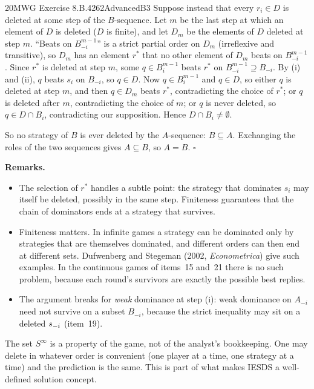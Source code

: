 \begin{exsol}{20}{MWG Exercise 8.B.4}{262}{Advanced}{B3}
Suppose instead that every $r_i \in D$ is deleted at some step of the $B$-sequence. Let $m$ be the
last step at which an element of $D$ is deleted ($D$ is finite), and let $D_m$ be the elements of
$D$ deleted at step $m$. ``Beats on $B_{-i}^{m-1}$'' is a strict partial order on $D_m$
(irreflexive and transitive), so $D_m$ has an element $r^*$ that no other element of $D_m$
beats on $B_{-i}^{m-1}$. Since $r^*$ is deleted at step $m$, some $q \in B_i^{m-1}$ beats $r^*$
on $B_{-i}^{m-1} \supseteq B_{-i}$. By (i) and (ii), $q$ beats $s_i$ on $B_{-i}$, so $q \in D$.
Now $q \in B_i^{m-1}$ and $q \in D$, so either $q$ is deleted at step $m$, and then $q \in D_m$
beats $r^*$, contradicting the choice of $r^*$; or $q$ is deleted after $m$, contradicting the
choice of $m$; or $q$ is never deleted, so $q \in D \cap B_i$, contradicting our supposition.
Hence $D \cap B_i \ne \emptyset$.

So no strategy of $B$ is ever deleted by the $A$-sequence: $B \subseteq A$. Exchanging the roles
of the two sequences gives $A \subseteq B$, so $A = B$. \hfill$\square$

\textbf{Remarks.}
\begin{itemize}
  \item The selection of $r^*$ handles a subtle point: the strategy that dominates $s_i$ may itself
  be deleted, possibly in the same step. Finiteness guarantees that the chain of dominators
  ends at a strategy that survives.
  \item Finiteness matters. In infinite games a strategy can be dominated only by strategies that
  are themselves dominated, and different orders can then end at different sets. Dufwenberg and
  Stegeman (2002, \emph{Econometrica}) give such examples. In the continuous games of items~15
  and~21 there is no such problem, because each round's survivors are exactly the possible best
  replies.
  \item The argument breaks for \emph{weak} dominance at step (i): weak dominance on $A_{-i}$ need not
  survive on a subset $B_{-i}$, because the strict inequality may sit on a deleted $s_{-i}$
  (item~19).
\end{itemize}

\interp The set $S^\infty$ is a property of the game, not of the analyst's bookkeeping. One may
delete in whatever order is convenient (one player at a time, one strategy at a time) and the
prediction is the same. This is part of what makes IESDS a well-defined solution concept.


\end{exsol}
